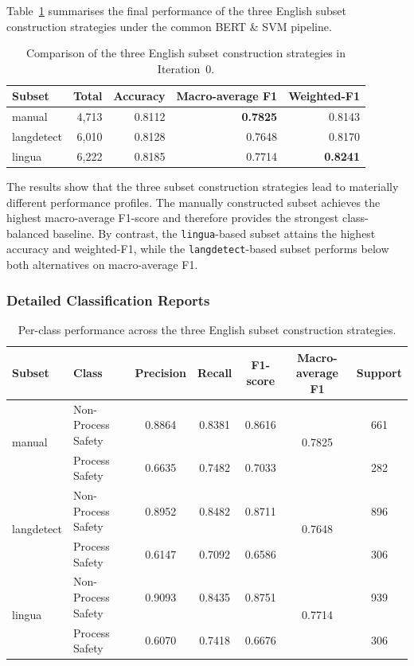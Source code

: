 \documentclass[11pt, titlepage, bibliography=totoc]{scrreprt}
\begin{document}
Table~\ref{tab:iter0_comparison_summary} summarises the final performance of the three English subset construction strategies under the common BERT \& SVM pipeline.

\begin{table}[h!]
\centering
\caption{Comparison of the three English subset construction strategies in Iteration~0.}
\label{tab:iter0_comparison_summary}
\begin{tabular}{lrrrr}
\toprule
\textbf{Subset} & \textbf{Total} & \textbf{Accuracy} & \textbf{Macro-average F1} & \textbf{Weighted-F1} \\
\midrule
manual     & 4,713 & 0.8112 & \textbf{0.7825} & 0.8143 \\
langdetect & 6,010 & 0.8128 & 0.7648 & 0.8170 \\
lingua     & 6,222 & 0.8185 & 0.7714 & \textbf{0.8241} \\
\bottomrule
\end{tabular}
\end{table}

The results show that the three subset construction strategies lead to materially different performance profiles. The manually constructed subset achieves the highest macro-average F1-score and therefore provides the strongest class-balanced baseline. By contrast, the \texttt{lingua}-based subset attains the highest accuracy and weighted-F1, while the \texttt{langdetect}-based subset performs below both alternatives on macro-average F1.

\subsubsection{Detailed Classification Reports}

\begin{table}[h!]
\centering
\caption{Per-class performance across the three English subset construction strategies.}
\label{tab:iter0_per_class_metrics}
\begin{tabular}{llccccc}
\toprule
\textbf{Subset} & \textbf{Class} & \textbf{Precision} & \textbf{Recall} & \textbf{F1-score} & \textbf{Macro-average F1} & \textbf{Support} \\
\midrule
\multirow{2}{*}{manual}
    & Non-Process Safety & 0.8864 & 0.8381 & 0.8616 & \multirow{2}{*}{0.7825} & 661 \\
    & Process Safety     & 0.6635 & 0.7482 & 0.7033 &  & 282 \\
\midrule
\multirow{2}{*}{langdetect}
    & Non-Process Safety & 0.8952 & 0.8482 & 0.8711 & \multirow{2}{*}{0.7648} & 896 \\
    & Process Safety     & 0.6147 & 0.7092 & 0.6586 &  & 306 \\
\midrule
\multirow{2}{*}{lingua}
    & Non-Process Safety & 0.9093 & 0.8435 & 0.8751 & \multirow{2}{*}{0.7714} & 939 \\
    & Process Safety     & 0.6070 & 0.7418 & 0.6676 &  & 306 \\
\bottomrule
\end{tabular}
\end{table}
\end{document}
